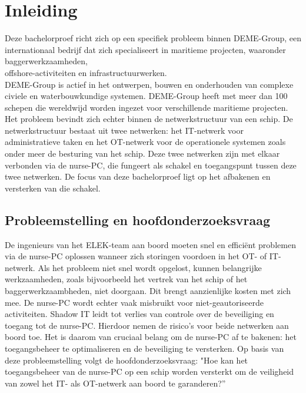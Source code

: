 


% 

\section{Inleiding}%
\label{sec:inleiding}
Deze bachelorproef richt zich op een specifiek probleem binnen DEME-Group, een internationaal bedrijf dat zich specialiseert in maritieme projecten, waaronder 
baggerwerkzaamheden, \\offshore-activiteiten en infrastructuurwerken. \\DEME-Group is actief in het ontwerpen, bouwen en onderhouden van complexe civiele en 
waterbouwkundige systemen. DEME-Group heeft met meer dan 100 schepen die wereldwijd worden ingezet voor verschillende maritieme projecten. Het probleem 
bevindt zich echter binnen de netwerkstructuur van een schip. De netwerkstructuur bestaat uit twee netwerken: het IT-netwerk voor administratieve taken 
en het OT-netwerk voor de operationele systemen zoals onder meer de besturing van het schip. Deze twee netwerken zijn met elkaar verbonden via de nurse-PC, 
die fungeert als schakel en toegangspunt tussen deze twee netwerken. De focus van deze bachelorproef ligt op het afbakenen en versterken van die schakel.


\subsection{Probleemstelling en hoofdonderzoeksvraag}
De ingenieurs van het ELEK-team aan boord moeten snel en efficiënt problemen via de nurse-PC oplossen wanneer zich storingen voordoen in het OT- of  IT-netwerk.  
Als het probleem niet snel wordt opgelost, kunnen belangrijke werkzaamheden, zoals bijvoorbeeld het vertrek van het schip of het baggerwerkzaambheden, niet doorgaan. 
Dit brengt aanzienlijke kosten met zich mee. De nurse-PC wordt echter vaak misbruikt voor niet-geautoriseerde activiteiten. Shadow IT leidt tot verlies van controle 
over de beveiliging en toegang tot de nurse-PC.  Hierdoor nemen de risico’s voor beide netwerken aan boord toe. Het is daarom van cruciaal belang om de nurse-PC af 
te bakenen: het toegangsbeheer te optimaliseren en de beveiliging te versterken. Op basis van deze probleemstelling volgt de hoofdonderzoeksvraag: 
"Hoe kan het toegangsbeheer van de nurse-PC op een schip worden versterkt om de veiligheid van zowel het IT- als OT-netwerk aan boord te garanderen?” 

